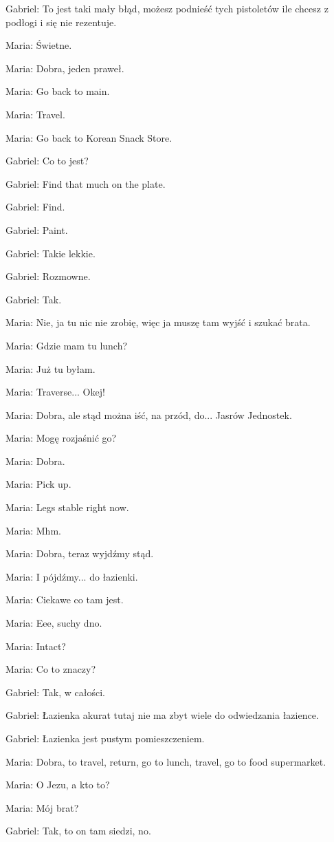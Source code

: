 Gabriel: To jest taki mały błąd, możesz podnieść tych pistoletów ile chcesz z podłogi i się nie rezentuje.

Maria: Świetne.

Maria: Dobra, jeden praweł.

Maria: Go back to main.

Maria: Travel.

Maria: Go back to Korean Snack Store.

Gabriel: Co to jest?

Gabriel: Find that much on the plate.

Gabriel: Find.

Gabriel: Paint.

Gabriel: Takie lekkie.

Gabriel: Rozmowne.

Gabriel: Tak.

Maria: Nie, ja tu nic nie zrobię, więc ja muszę tam wyjść i szukać brata.

Maria: Gdzie mam tu lunch?

Maria: Już tu byłam.

Maria: Traverse... Okej!

Maria: Dobra, ale stąd można iść, na przód, do... Jasrów Jednostek.

Maria: Mogę rozjaśnić go?

Maria: Dobra.

Maria: Pick up.

Maria: Legs stable right now.

Maria: Mhm.

Maria: Dobra, teraz wyjdźmy stąd.

Maria: I pójdźmy... do łazienki.

Maria: Ciekawe co tam jest.

Maria: Eee, suchy dno.

Maria: Intact?

Maria: Co to znaczy?

Gabriel: Tak, w całości.

Gabriel: Łazienka akurat tutaj nie ma zbyt wiele do odwiedzania łazience.

Gabriel: Łazienka jest pustym pomieszczeniem.

Maria: Dobra, to travel, return, go to lunch, travel, go to food supermarket.

Maria: O Jezu, a kto to?

Maria: Mój brat?

Gabriel: Tak, to on tam siedzi, no.

